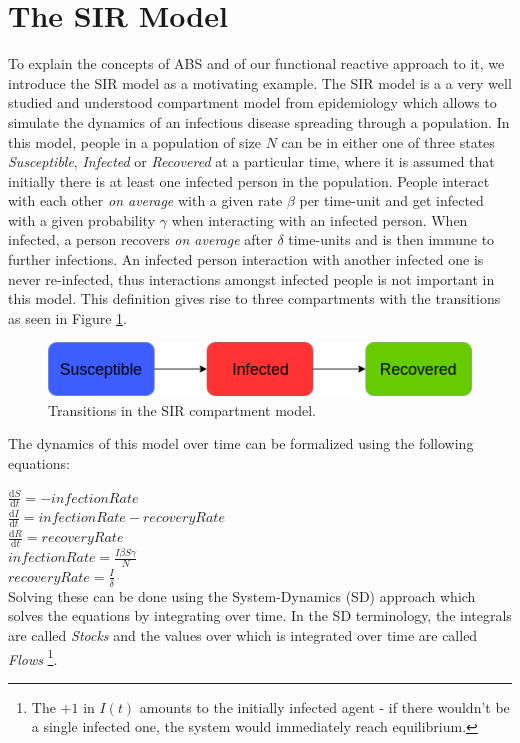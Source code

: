 \section{The SIR Model}
To explain the concepts of ABS and of our functional reactive approach to it, we introduce the SIR model as a motivating example. The SIR model is a a very well studied and understood compartment model from epidemiology which allows to simulate the dynamics of an infectious disease spreading through a population. In this model, people in a population of size $N$ can be in either one of three states \textit{Susceptible}, \textit{Infected} or \textit{Recovered} at a particular time, where it is assumed that initially there is at least one infected person in the population. People interact with each other \textit{on average} with a given rate $\beta$ per time-unit and get infected with a given probability $\gamma$ when interacting with an infected person. When infected, a person recovers \textit{on average} after $\delta$ time-units and is then immune to further infections. An infected person interaction with another infected one is never re-infected, thus interactions amongst infected people is not important in this model. This definition gives rise to three compartments with the transitions as seen in Figure \ref{fig:sir_transitions}.

\begin{figure}
	\centering
	\includegraphics[width=.4\textwidth, angle=0]{./fig/SIR_transitions.png}
	\caption{Transitions in the SIR compartment model.}
	\label{fig:sir_transitions}
\end{figure}

The dynamics of this model over time can be formalized using the following equations:

$\frac{\mathrm d S}{\mathrm d t} = -infectionRate$ \\
$\frac{\mathrm d I}{\mathrm d t} = infectionRate - recoveryRate$ \\
$\frac{\mathrm d R}{\mathrm d t} = recoveryRate$ \\

$infectionRate = \frac{I \beta S \gamma}{N}$ \\
$recoveryRate = \frac{I}{\delta}$ \\

Solving these can be done using the System-Dynamics (SD) approach which solves the equations by integrating over time. In the SD terminology, the integrals are called \textit{Stocks} and the values over which is integrated over time are called \textit{Flows} \footnote{The $+1$ in $I(t)$ amounts to the initially infected agent - if there wouldn't be a single infected one, the system would immediately reach equilibrium.}.

